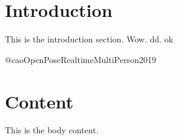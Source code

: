 \section{Introduction}
This is the introduction section. Wow. dd. ok 

@caoOpenPoseRealtimeMultiPerson2019

\section{Content}
This is the body content.